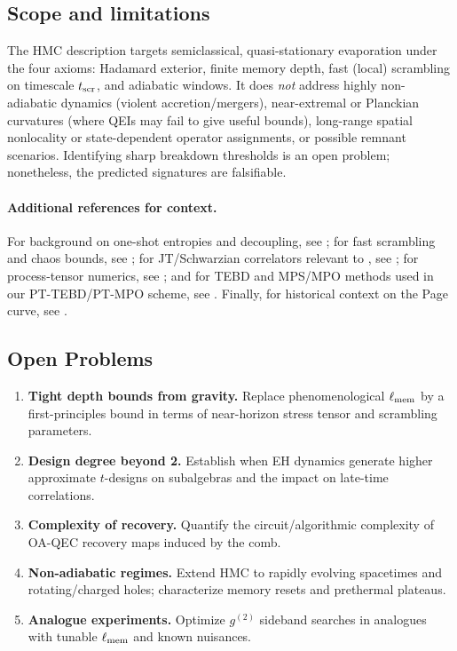 \documentclass[a4paper,11pt]{article}
\newcommand{\HMC}{\textsc{HMC}\xspace}
\theoremstyle{plain}
\theoremstyle{definition}
\theoremstyle{remark}
\begin{document}
\subsection{Scope and limitations}
The \HMC{} description targets semiclassical, quasi-stationary evaporation under the four axioms: Hadamard exterior, finite memory depth, fast (local) scrambling on timescale $t_{\rm scr}$, and adiabatic windows. It does \emph{not} address highly non-adiabatic dynamics (violent accretion/mergers), near-extremal or Planckian curvatures (where QEIs may fail to give useful bounds), long-range spatial nonlocality or state-dependent operator assignments, or possible remnant scenarios. Identifying sharp breakdown thresholds is an open problem; nonetheless, the predicted signatures are falsifiable.

\paragraph{Additional references for context.} For background on one-shot entropies and decoupling, see \cite{Horodecki:2009}; for fast scrambling and chaos bounds, see \cite{Sekino:2008,Maldacena:2016}; for JT/Schwarzian correlators relevant to , see \cite{StanfordWitten:2017}; for process-tensor numerics, see \cite{Strathearn:2018}; and for TEBD and MPS/MPO methods used in our PT-TEBD/PT-MPO scheme, see \cite{Vidal:2003,Vidal:2004}. Finally, for historical context on the Page curve, see \cite{Page:1976}.

\subsection*{Open Problems}
\begin{enumerate}[leftmargin=*]
\item \textbf{Tight depth bounds from gravity.} Replace phenomenological $\ell_{\rm mem}$ by a first-principles bound in terms of near-horizon stress tensor and scrambling parameters.
\item \textbf{Design degree beyond 2.} Establish when EH dynamics generate higher approximate $t$-designs on subalgebras and the impact on late-time correlations.
\item \textbf{Complexity of recovery.} Quantify the circuit/algorithmic complexity of OA-QEC recovery maps induced by the comb.
\item \textbf{Non-adiabatic regimes.} Extend \HMC{} to rapidly evolving spacetimes and rotating/charged holes; characterize memory resets and prethermal plateaus.
\item \textbf{Analogue experiments.} Optimize $g^{(2)}$ sideband searches in analogues with tunable $\ell_{\rm mem}$ and known nuisances.
\end{enumerate}
\end{document}
